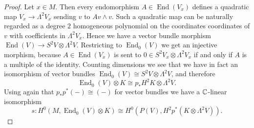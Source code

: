 \documentclass[A4paper, 12pt, british, reqno]{amsart}
\DeclareMathOperator{\End}{End}
\newcommand{\ot}{\otimes}
\begin{document}
\begin{prop}
\begin{proof}
	Let $x\in M$.
	Then every endomorphism $A\in \End(V_{x})$ defines a quadratic map $V_{x}\to \Lambda^{2}V_{x}$ sending $v$ to $Av\wedge v$.
	Such a quadratic map can be naturally regarded as a degree $2$ homogeneous polynomial on the coordinates coordinates of $v$ with coefficients in $\Lambda^{2}V_{x}$.
	Hence we have a vector bundle morphism $\End(V)\to S^{2}V\ot \Lambda^{2}V$.
	Restricting to $\End_{0}(V)$ we get an injective morphism, because $A\in \End(V_{x})$ is sent to $0\in S^{2}V_{x}\ot \Lambda^{2}V_{x}$ if and only if $A$ is a multiple of the identity.
	Counting dimensions we see that we have in fact an isomorphism of vector bundles $\End_{0}(V)\cong S^{2}V\ot \Lambda^{2}V$, and therefore
	\[ \End_{0}(V)\ot K\cong p_{*}H^{2}K\ot \Lambda^{2}V. \]
	Using again that $p_{*}p^{*}(-)\cong (-)$ for vector bundles we have a $\mathbb{C}$-linear isomorphism
	\[ s\colon H^{0}(M,\End_{0}(V)\ot K)\cong H^{0}(P(V),H^{2}p^{*}(K\ot \Lambda^{2}V)). \]
    \end{proof}
\end{prop}



\vspace{0.3cm}
\end{document}
